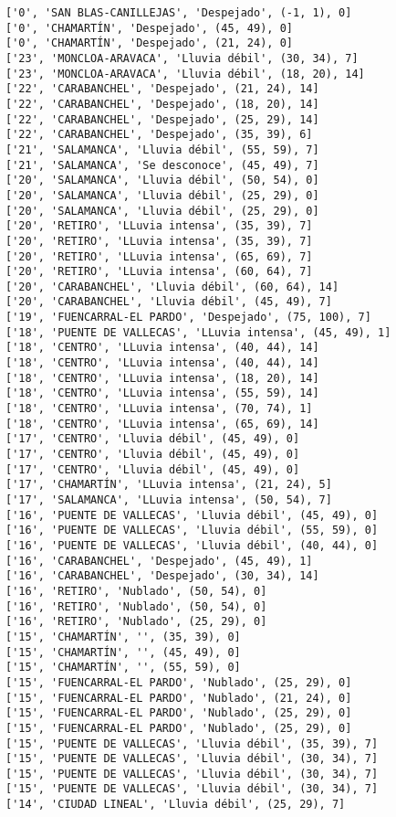 \documentclass[11pt]{article}
\begin{document}
\begin{Verbatim}[commandchars=\\\{\}]
['0', 'SAN BLAS-CANILLEJAS', 'Despejado', (-1, 1), 0]
['0', 'CHAMARTÍN', 'Despejado', (45, 49), 0]
['0', 'CHAMARTÍN', 'Despejado', (21, 24), 0]
['23', 'MONCLOA-ARAVACA', 'Lluvia débil', (30, 34), 7]
['23', 'MONCLOA-ARAVACA', 'Lluvia débil', (18, 20), 14]
['22', 'CARABANCHEL', 'Despejado', (21, 24), 14]
['22', 'CARABANCHEL', 'Despejado', (18, 20), 14]
['22', 'CARABANCHEL', 'Despejado', (25, 29), 14]
['22', 'CARABANCHEL', 'Despejado', (35, 39), 6]
['21', 'SALAMANCA', 'Lluvia débil', (55, 59), 7]
['21', 'SALAMANCA', 'Se desconoce', (45, 49), 7]
['20', 'SALAMANCA', 'Lluvia débil', (50, 54), 0]
['20', 'SALAMANCA', 'Lluvia débil', (25, 29), 0]
['20', 'SALAMANCA', 'Lluvia débil', (25, 29), 0]
['20', 'RETIRO', 'LLuvia intensa', (35, 39), 7]
['20', 'RETIRO', 'LLuvia intensa', (35, 39), 7]
['20', 'RETIRO', 'LLuvia intensa', (65, 69), 7]
['20', 'RETIRO', 'LLuvia intensa', (60, 64), 7]
['20', 'CARABANCHEL', 'Lluvia débil', (60, 64), 14]
['20', 'CARABANCHEL', 'Lluvia débil', (45, 49), 7]
['19', 'FUENCARRAL-EL PARDO', 'Despejado', (75, 100), 7]
['18', 'PUENTE DE VALLECAS', 'LLuvia intensa', (45, 49), 1]
['18', 'CENTRO', 'LLuvia intensa', (40, 44), 14]
['18', 'CENTRO', 'LLuvia intensa', (40, 44), 14]
['18', 'CENTRO', 'LLuvia intensa', (18, 20), 14]
['18', 'CENTRO', 'LLuvia intensa', (55, 59), 14]
['18', 'CENTRO', 'LLuvia intensa', (70, 74), 1]
['18', 'CENTRO', 'LLuvia intensa', (65, 69), 14]
['17', 'CENTRO', 'Lluvia débil', (45, 49), 0]
['17', 'CENTRO', 'Lluvia débil', (45, 49), 0]
['17', 'CENTRO', 'Lluvia débil', (45, 49), 0]
['17', 'CHAMARTÍN', 'LLuvia intensa', (21, 24), 5]
['17', 'SALAMANCA', 'LLuvia intensa', (50, 54), 7]
['16', 'PUENTE DE VALLECAS', 'Lluvia débil', (45, 49), 0]
['16', 'PUENTE DE VALLECAS', 'Lluvia débil', (55, 59), 0]
['16', 'PUENTE DE VALLECAS', 'Lluvia débil', (40, 44), 0]
['16', 'CARABANCHEL', 'Despejado', (45, 49), 1]
['16', 'CARABANCHEL', 'Despejado', (30, 34), 14]
['16', 'RETIRO', 'Nublado', (50, 54), 0]
['16', 'RETIRO', 'Nublado', (50, 54), 0]
['16', 'RETIRO', 'Nublado', (25, 29), 0]
['15', 'CHAMARTÍN', '', (35, 39), 0]
['15', 'CHAMARTÍN', '', (45, 49), 0]
['15', 'CHAMARTÍN', '', (55, 59), 0]
['15', 'FUENCARRAL-EL PARDO', 'Nublado', (25, 29), 0]
['15', 'FUENCARRAL-EL PARDO', 'Nublado', (21, 24), 0]
['15', 'FUENCARRAL-EL PARDO', 'Nublado', (25, 29), 0]
['15', 'FUENCARRAL-EL PARDO', 'Nublado', (25, 29), 0]
['15', 'PUENTE DE VALLECAS', 'Lluvia débil', (35, 39), 7]
['15', 'PUENTE DE VALLECAS', 'Lluvia débil', (30, 34), 7]
['15', 'PUENTE DE VALLECAS', 'Lluvia débil', (30, 34), 7]
['15', 'PUENTE DE VALLECAS', 'Lluvia débil', (30, 34), 7]
['14', 'CIUDAD LINEAL', 'Lluvia débil', (25, 29), 7]

\end{Verbatim}
\end{document}
